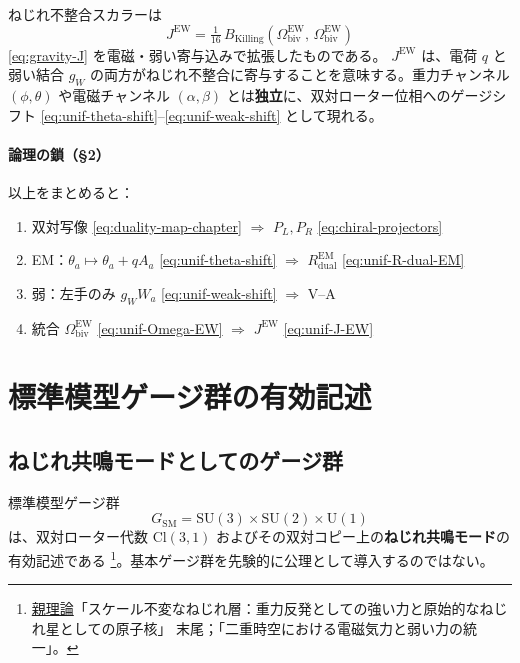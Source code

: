 \documentclass[dvipdfmx,a4paper,oneside]{jsbook}
\numberwithin{equation}{chapter}
\begin{document}
ねじれ不整合スカラーは
\begin{equation}
  J^{\mathrm{EW}}
  = \tfrac{1}{16}\, B_{\mathrm{Killing}}(\Omega_{\mathrm{biv}}^{\mathrm{EW}},\,\Omega_{\mathrm{biv}}^{\mathrm{EW}})
  \label{eq:unif-J-EW}
\end{equation}
\eqref{eq:gravity-J} を電磁・弱い寄与込みで拡張したものである。
\(J^{\mathrm{EW}}\) は、電荷 \(q\) と弱い結合 \(g_W\) の両方がねじれ不整合に寄与することを意味する。重力チャンネル \((\phi,\theta)\) や電磁チャンネル \((\alpha,\beta)\) とは\textbf{独立}に、双対ローター位相へのゲージシフト \eqref{eq:unif-theta-shift}–\eqref{eq:unif-weak-shift} として現れる。

\paragraph{論理の鎖（§2）}
以上をまとめると：
\begin{enumerate}[leftmargin=2em]
  \item 双対写像 \eqref{eq:duality-map-chapter} \(\Rightarrow\) \(P_L, P_R\) \eqref{eq:chiral-projectors}
  \item EM：\(\theta_a \mapsto \theta_a + q A_a\) \eqref{eq:unif-theta-shift} \(\Rightarrow\) \(R_{\mathrm{dual}}^{\mathrm{EM}}\) \eqref{eq:unif-R-dual-EM}
  \item 弱：左手のみ \(g_W W_a\) \eqref{eq:unif-weak-shift} \(\Rightarrow\) V--A
  \item 統合 \(\Omega_{\mathrm{biv}}^{\mathrm{EW}}\) \eqref{eq:unif-Omega-EW} \(\Rightarrow\) \(J^{\mathrm{EW}}\) \eqref{eq:unif-J-EW}
\end{enumerate}

\section{標準模型ゲージ群の有効記述}

\subsection{ねじれ共鳴モードとしてのゲージ群}

標準模型ゲージ群
\begin{equation}
  G_{\mathrm{SM}}
  = \mathrm{SU}(3) \times \mathrm{SU}(2) \times \mathrm{U}(1)
  \label{eq:unif-SM-group}
\end{equation}
は、双対ローター代数 \(\mathrm{Cl}(3,1)\) およびその双対コピー上の\textbf{ねじれ共鳴モード}の有効記述である \footnote{\hyperref[sec:sister-manuscripts]{親理論}「スケール不変なねじれ層：重力反発としての強い力と原始的なねじれ星としての原子核」 末尾；「二重時空における電磁気力と弱い力の統一」。}。基本ゲージ群を先験的に公理として導入するのではない。
\end{document}
